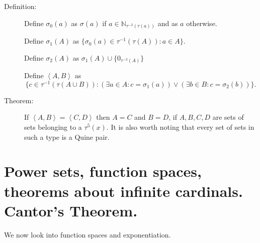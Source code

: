 \documentclass[12pt]{article}
\begin{document}
\begin{description}

\item[Definition:]  Define $\sigma_0(a)$ as $\sigma(a)$ if $a \in {\mathbb N}_{\tau^{-2}(\tau(a))}$ and as $a$ otherwise.

Define $\sigma_1(A)$ as $\{\sigma_0(a) \in \tau^{-1}(\tau(A)):a \in A\}$.

Define $\sigma_2(A)$ as $\sigma_1(A) \cup \{0_{\tau^{-3}(A)}\}$

Define $\left<A,B\right>$ as $$\{c \in \tau^{-1}(\tau(A \cup B)): (\exists a \in A:c=\sigma_1(a)) \vee (\exists b \in B:c = \sigma_2(b))\}.$$

\item[Theorem:]  If $\left<A,B\right>=\left<C,D\right>$ then $A=C$ and $B=D$, if $A,B,C,D$ are sets of sets belonging to a $\tau^5(x)$.  It is also worth noting that every set of sets in such a type is a Quine pair.

\end{description}

\newpage

\section{Power sets, function spaces, theorems about infinite cardinals.  Cantor's Theorem.}

We now look into function spaces and exponentiation.
\end{document}

